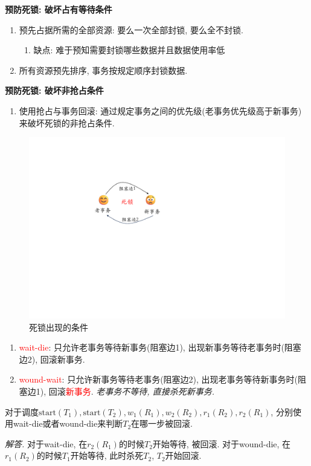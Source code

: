 \textbf{预防死锁: 破坏占有等待条件}

\begin{enumerate}
    \item 预先占据所需的全部资源: 要么一次全部封锁, 要么全不封锁.
    \begin{enumerate}
        \item 缺点: 难于预知需要封锁哪些数据并且数据使用率低
    \end{enumerate}
    \item 所有资源预先排序, 事务按规定顺序封锁数据.
\end{enumerate}

\textbf{预防死锁: 破坏非抢占条件}
\begin{enumerate}
    \item 使用抢占与事务回滚: 通过规定事务之间的优先级(老事务优先级高于新事务)来破坏死锁的非抢占条件.
\end{enumerate}

\begin{figure}[H]
    \centering
    \includegraphics[width=.4\textwidth]{figure/死锁2.pdf}
    \caption{死锁出现的条件}
\end{figure}

\begin{enumerate}
    \item \textcolor{red}{wait-die}: 只允许老事务等待新事务(阻塞边1), 出现新事务等待老事务时(阻塞边2), 回滚新事务.
    \item \textcolor{red}{wound-wait}: 只允许新事务等待老事务(阻塞边2), 出现老事务等待新事务时(阻塞边1), 回滚\textcolor{red}{新事务}. \textit{老事务不等待, 直接杀死新事务.}
\end{enumerate}

\begin{example}
  对于调度$\text{start}(T_1), \text{start}(T_2), w_1(R_1), w_2(R_2), r_1(R_2), r_2(R_1)$, 分别使用wait-die或者wound-die来判断$T_2$在哪一步被回滚.
\end{example}

\textit{ 解答. }对于wait-die, 在$r_2(R_1)$的时候$T_2$开始等待, 被回滚. 对于wound-die, 在$r_1(R_2)$的时候$T_1$开始等待, 此时杀死$T_2$, $T_2$开始回滚.

